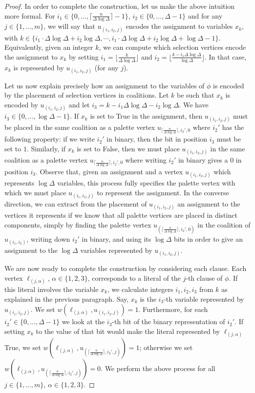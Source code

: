\documentclass[letterpaper,USenglish,cleveref, autoref, thm-restate]{lipics-v2021}
\begin{document}
\begin{proof}
In order to complete the construction, let us make the above intuition more
formal. For $i_1\in \{0,\ldots,\lceil\frac{n}{\Delta\log \Delta}\rceil-1\}$,
$i_2\in \{0,\ldots,\Delta-1\}$ and for any $j\in\{1,\ldots,m\}$, we will say
that $u_{(i_1,i_2,j)}$ encodes the assignment to variables $x_k$, with $k\in
\{i_1\cdot \Delta\log\Delta +i_2\log\Delta, \cdots, i_1\cdot \Delta\log\Delta
+i_2\log\Delta+\log\Delta-1\}$. Equivalently, given an integer $k$, we can
compute which selection vertices encode the assignment to $x_k$ by setting
$i_1=\lfloor \frac{k}{\Delta\log\Delta}\rfloor$ and $i_2 = \lfloor
\frac{k-i_1\Delta\log \Delta}{\log\Delta} \rfloor$. In that case, $x_k$ is
represented by $u_{(i_1,i_2,j)}$ (for any $j$).

Let us now explain precisely how an assignment to the variables of $\phi$ is
encoded by the placement of selection vertices in coalitions. Let $k$ be such
that $x_k$ is encoded by $u_{(i_1,i_2,j)}$ and let $i_3 = k-
i_1\Delta\log\Delta -i_2\log\Delta$. We have $i_3\in\{0,\ldots,\log\Delta-1\}$.
If $x_k$ is set to True in the assignment, then $u_{(i_1,i_2,j)}$ must be
placed in the same coalition as a palette vertex $u_{\lceil
\frac{n}{\Delta\log\Delta}\rceil, i_2',0}$ where $i_2'$ has the following
property: if we write $i_2'$ in binary, then the bit in position $i_3$ must be
set to $1$. Similarly, if $x_k$ is set to False, then we must place
$u_{(i_1,i_2,j)}$ in the same coalition as a palette vertex $u_{\lceil
\frac{n}{\Delta\log\Delta}\rceil, i_2',0}$ where writing $i_2'$ in binary gives
a $0$ in position $i_3$. Observe that, given an assignment and a vertex
$u_{(i_1,i_2,j)}$ which represents $\log\Delta$ variables, this process fully
specifies the palette vertex with which we must place $u_{(i_1,i_2,j)}$ to
represent the assignment.  In the converse direction, we can extract from the
placement of $u_{(i_1,i_2,j)}$ an assignment to the vertices it represents if
we know that all palette vertices are placed in distinct components, simply by
finding the palette vertex
$u_{(\lceil\frac{n}{\Delta\log\Delta}\rceil,i_2',0)}$ in the coalition of
$u_{(i_1,i_2)}$, writing down $i_2'$ in binary, and using its $\log\Delta$ bits
in order to give an assignment to the $\log\Delta$ variables represented by
$u_{(i_1,i_2,j)}$.

We are now ready to complete the construction by considering each clause. Each
vertex $\ell_{(j,\alpha)}$, $\alpha\in\{1,2,3\}$, corresponds to a literal of
the $j$-th clause of $\phi$.  If this literal involves the variable $x_k$, we
calculate integers $i_1,i_2,i_3$ from $k$ as explained in the previous
paragraph. Say, $x_k$ is the $i_3$-th variable represented by
$u_{(i_1,i_2,j)}$.  We set $w(\ell_{(j,\alpha)},u_{(i_1,i_2,j)})=1$.
Furthermore, for each $i_2'\in\{0,\ldots,\Delta-1\}$ we look at the $i_3$-th
bit of the binary representation of $i_2'$. If setting $x_k$ to the value of
that bit would make the literal represented by $\ell_{(j,\alpha)}$ True, we set
$w(\ell_{(j,\alpha)},u_{(\lceil\frac{n}{\Delta\log\Delta}\rceil,i_2',j)})=1$;
otherwise we set
$w(\ell_{(j,\alpha)},u_{(\lceil\frac{n}{\Delta\log\Delta}\rceil,i_2',j)})=0$.
We perform the above process for all $j\in\{1,\ldots,m\}$,
$\alpha\in\{1,2,3\}$.


\end{proof}
\end{document}
